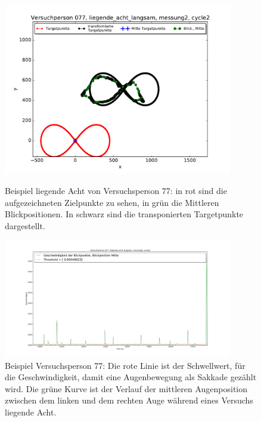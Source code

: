 \documentclass[12pt]{article}
\begin{document}
\begin{landscape}
\begin{figure}[t]
	\begin{minipage}[ht]{10cm}
	\noindent \begin{centering}	
		\includegraphics[width=10cm]{Bilder/AufzeichnungVP77.pdf}
		\par\end{centering}
	\caption{\label{fig:rohdaten}Beispiel liegende Acht von Versuchsperson 77: in rot sind die aufgezeichneten Zielpunkte zu sehen, in gr\"un die Mittleren Blickpositionen. In schwarz sind die transponierten Targetpunkte dargestellt.}
    \end{minipage}
	\qquad
    \begin{minipage}[ht]{10cm}	
	\noindent \begin{centering}
		\includegraphics[width=10cm]{Bilder/figure_saccade_vp_77.png}
		\par\end{centering}
	\caption{\label{fig:DiagrammSakkaden}Beispiel Versuchsperson 77: Die rote Linie ist der Schwellwert, f\"ur die Geschwindigkeit, damit eine Augenbewegung als Sakkade gez\"ahlt wird. Die gr\"une Kurve ist der Verlauf der mittleren Augenposition zwischen dem linken und dem rechten Auge w\"ahrend eines Versuchs liegende Acht.}
    \end{minipage}
\end{figure}
\end{landscape}




\end{document}
